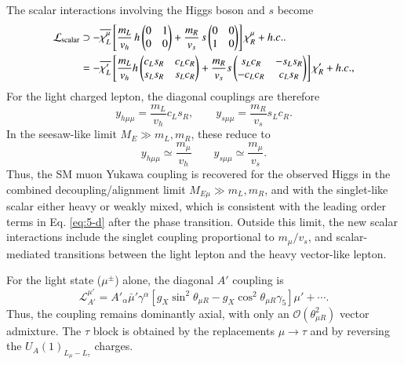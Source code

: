 \documentclass[onecolumn, aps, nofootinbib, prd, preprint, floats, floatfix, amsmath, amssymb, superscriptaddress, preprintnumbers]{revtex4-2}
\begin{document}
The scalar interactions involving the Higgs boson and $s$ become
\begin{equation}
\begin{aligned}
\mathcal{L}_{\rm scalar} &
\supset-\overline{\chi_L^\mu}
\left[
\frac{m_L}{v_h}\,h
\begin{pmatrix}
0&1\\
0&0
\end{pmatrix}
+
\frac{m_R}{v_s}\,s
\begin{pmatrix}
0&0\\
1&0
\end{pmatrix}
\right]\chi_R^\mu
+h.c. .\\
&=-\overline{\chi'_L}
\left[\frac{m_L}{v_h} h \begin{pmatrix}
c_Ls_R&c_Lc_R\\
s_Ls_R&s_Lc_R
\end{pmatrix}+ \frac{m_R}{v_s} s \begin{pmatrix}
s_Lc_R&-s_Ls_R\\
-c_Lc_R&c_Ls_R
\end{pmatrix}\right]\chi'_R+h.c.,
\label{eq:gauge-basis-scalar-yukawa}
\end{aligned}
\end{equation}
For the light charged lepton, the diagonal couplings are therefore
\begin{equation}
y_{h\mu\mu}=
\frac{m_L}{v_h}c_Ls_R,
\qquad
y_{s\mu\mu}=\frac{m_R}{v_s}s_Lc_R .
\label{eq:light-scalar-yukawa}
\end{equation}
In the seesaw-like limit $M_E\gg m_L,m_R$, these reduce to
\begin{equation}
y_{h\mu\mu}\simeq
\frac{m_\mu}{v_h}
\qquad
y_{s\mu\mu}\simeq \frac{m_\mu}{v_s}.
\label{eq:sm-limit-scalar-yukawa}
\end{equation}
Thus, the SM muon Yukawa coupling is recovered for the observed Higgs in the combined decoupling/alignment limit $M_{E\mu}\gg m_L,m_R$, and with the singlet-like scalar either heavy or weakly mixed, which is consistent with the leading order terms in Eq. \eqref{eq:5-d} after the phase transition. Outside this limit, the new scalar interactions include the singlet coupling proportional to $m_\mu/v_s$, and scalar-mediated transitions between the light lepton and the heavy vector-like lepton.

For the light state ($\mu^\pm$) alone, the diagonal $A'$ coupling is
\begin{equation}
\mathcal{L}_{A'}^{\mu'}
=
A'_\alpha\bar\mu'\gamma^\alpha
\left[
g_X\sin^2\theta_{\mu R}
-g_X\cos^2\theta_{\mu R} \gamma_5
\right]\mu'
+\cdots .
\label{eq:light-muon-Apr}
\end{equation}
Thus, the coupling remains dominantly axial, with only an $\mathcal{O}(\theta_{\mu R}^2)$ vector admixture. The $\tau$ block is obtained by the replacements $\mu\to\tau$ and by reversing the $U_A(1)_{L_\mu-L_\tau}$ charges.
\end{document}
